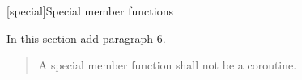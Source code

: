 
\setcounter{chapter}{11}
[special]{Special member functions}

In this section add paragraph 6.

\begin{quote}
	\setcounter{Paras}{5}
	\pnum
	A special member function shall not be a coroutine.
\end{quote}


